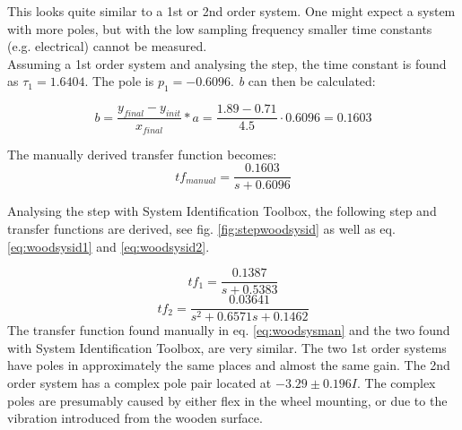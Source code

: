 This looks quite similar to a 1st or 2nd order system. One might expect a system with more poles, but with the low sampling frequency smaller time constants (e.g. electrical) cannot be measured. \\
Assuming a 1st order system and analysing the step, the time constant is found as $\tau_1 = 1.6404$. The pole is $p_1 = -0.6096$. \textit{b} can then be calculated:

\begin{equation}
    b = \frac{y_{final} - y_{init}}{x_{final}}* a =  \frac{1.89-0.71}{4.5} \cdot 0.6096 = 0.1603
\end{equation}

The manually derived transfer function becomes:
\begin{equation}\label{eq:woodsysman}
    tf_{manual} = \frac{0.1603}{s+0.6096}
\end{equation}

Analysing the step with System Identification Toolbox, the following step and transfer functions are derived, see fig. \ref{fig:stepwoodsysid} as well as eq. \ref{eq:woodsysid1} and \ref{eq:woodsysid2}. 


\begin{equation}\label{eq:woodsysid1}
    tf_1 = \frac{0.1387}{s+0.5383}
\end{equation}
\begin{equation}\label{eq:woodsysid2}
    tf_2 = \frac{0.03641}{s^2 + 0.6571 s + 0.1462}
\end{equation}
The transfer function found manually in eq. \ref{eq:woodsysman} and the two found with System Identification Toolbox, are very similar. The two 1st order systems have poles in approximately the same places and almost the same gain. 
The 2nd order system has a complex pole pair located at $-3.29 \pm 0.196 I$. The complex poles are presumably caused by either flex in the wheel mounting, or due to the vibration introduced from the wooden surface. 






